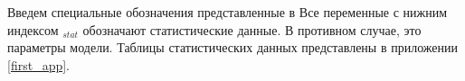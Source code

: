
Введем специальные обозначения представленные в%
Все переменные с нижним индексом $_{stat}$ обозначают статистические данные.
В противном случае, это параметры модели.
Таблицы статистических данных представлены в приложении \ref{first_app}.
